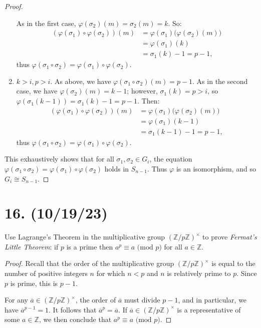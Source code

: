 \documentclass{article}
\begin{document}
\begin{proof}
\begin{enumerate}[itemsep=0em]
              As in the first case, $\varphi(\sigma_2)(m) = \sigma_2(m) = k$. So:
              \begin{align*}
                (\varphi(\sigma_1) \circ \varphi(\sigma_2))(m) &= \varphi(\sigma_1)\bigl(\varphi(\sigma_2)(m)\bigr) \\ &= \varphi(\sigma_1)(k) \\ &= \sigma_1(k) - 1 = p - 1,
              \end{align*}
              thus $\varphi(\sigma_1 \circ \sigma_2) = \varphi(\sigma_1) \circ \varphi(\sigma_2)$.
        \item $k > i, p > i$. As above, we have $\varphi(\sigma_1 \circ \sigma_2)(m) = p - 1$. As in the second case, we have $\varphi(\sigma_2)(m) = k - 1$; however, $\sigma_1(k) = p > i$, so $\varphi(\sigma_1(k - 1)) = \sigma_1(k) - 1 = p - 1$. Then:
              \begin{align*}
                (\varphi(\sigma_1) \circ \varphi(\sigma_2))(m) &= \varphi(\sigma_1)\bigl(\varphi(\sigma_2)(m)\bigr) \\ &= \varphi(\sigma_1)(k - 1) \\ &= \sigma_1(k - 1) - 1 = p - 1,
              \end{align*}
              thus $\varphi(\sigma_1 \circ \sigma_2) = \varphi(\sigma_1) \circ \varphi(\sigma_2)$.
    \end{enumerate}
    This exhaustively shows that for all $\sigma_1, \sigma_2 \in G_i$, the equation $\varphi(\sigma_1 \circ \sigma_2) = \varphi(\sigma_1) \circ \varphi(\sigma_2)$ holds in $S_{n - 1}$. Thus $\varphi$ is an isomorphism, and so $G_i \cong S_{n - 1}$.
\end{proof}

\section*{16. (10/19/23)}

Use Lagrange's Theorem in the multiplicative group $(\mathbb{Z}/p\mathbb{Z})^\times$ to prove \emph{Fermat's Little Theorem}: if $p$ is a prime then $a^p \equiv a \text{ (mod $p$)}$ for all $a \in \mathbb{Z}$.

\begin{proof}
    Recall that the order of the multiplicative group $(\mathbb{Z}/p\mathbb{Z})^\times$ is equal to the number of positive integers $n$ for which $n < p$ and $n$ is relatively prime to $p$. Since $p$ is prime, this is $p - 1$.

    For any $\overline{a} \in (\mathbb{Z}/p\mathbb{Z})^\times$, the order of $\overline{a}$ must divide $p - 1$, and in particular, we have $\overline{a}^{p - 1} = 1$. It follows that $\overline{a}^p = \overline{a}$. If $\overline{a} \in (\mathbb{Z}/p\mathbb{Z})^\times$ is a representative of some $a \in \mathbb{Z}$, we then conclude that $a^p \equiv a \text{ (mod $p$)}$.
\end{proof}
\end{document}
